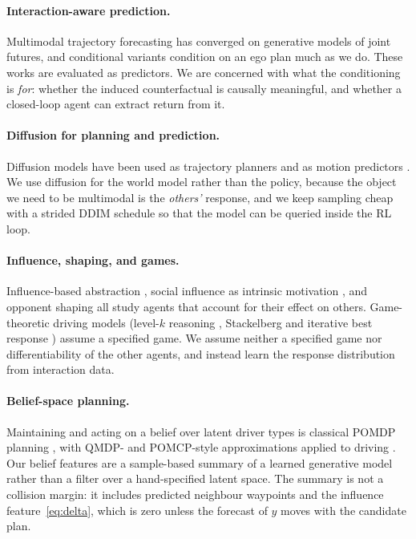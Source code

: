 \documentclass[conference]{IEEEtran}
\begin{document}
\paragraph{Interaction-aware prediction.} Multimodal trajectory forecasting
\cite{salzmann2020trajectron,yuan2021agentformer,shi2022mtr,ngiam2021scene} has
converged on generative models of joint futures, and conditional variants
\cite{tolstaya2021identifying,rhinehart2019precog} condition on an ego plan much
as we do. These works are evaluated as predictors. We are concerned with what
the conditioning is \emph{for}: whether the induced counterfactual is causally
meaningful, and whether a closed-loop agent can extract return from it.

\paragraph{Diffusion for planning and prediction.} Diffusion models have been
used as trajectory planners \cite{janner2022planning,ajay2023conditional} and as
motion predictors \cite{jiang2023motiondiffuser}. We use diffusion for the world
model rather than the policy, because the object we need to be multimodal is the
\emph{others'} response, and we keep sampling cheap with a strided DDIM schedule
\cite{song2021denoising} so that the model can be queried inside the RL loop.

\paragraph{Influence, shaping, and games.} Influence-based abstraction
\cite{oliehoek2021sufficient}, social influence as intrinsic motivation
\cite{jaques2019social}, and opponent shaping \cite{foerster2018lola,lu2022mfos}
all study agents that account for their effect on others. Game-theoretic driving
models (level-$k$ reasoning \cite{li2018game}, Stackelberg and iterative best
response \cite{fisac2019hierarchical}) assume a specified game. We assume neither a specified game nor differentiability of the other agents, and instead learn the response distribution from interaction data.

\paragraph{Belief-space planning.} Maintaining and acting on a belief over latent
driver types is classical POMDP planning \cite{kaelbling1998planning}, with
QMDP- and POMCP-style approximations applied to driving
\cite{sunberg2017value,bouton2018scalable}. Our belief features are a
sample-based summary of a learned generative model rather than a filter over a
hand-specified latent space. The summary is not a collision margin: it includes
predicted neighbour waypoints and the influence feature~\eqref{eq:delta}, which
is zero unless the forecast of $y$ moves with the candidate plan.
\end{document}
